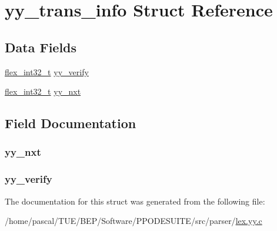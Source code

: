 \hypertarget{structyy__trans__info}{\section{yy\-\_\-trans\-\_\-info Struct Reference}
\label{structyy__trans__info}
}
\subsection*{Data Fields}
\begin{DoxyCompactItemize}
\item 
\hyperlink{lex_8yy_8c_a838ce943cf44ef7769480714fc6c3ba9}{flex\-\_\-int32\-\_\-t} \hyperlink{structyy__trans__info_a5faf5583708f5fa457bc1cb9bab86e38}{yy\-\_\-verify}
\item 
\hyperlink{lex_8yy_8c_a838ce943cf44ef7769480714fc6c3ba9}{flex\-\_\-int32\-\_\-t} \hyperlink{structyy__trans__info_a51bfd9e47041873b7b8075c677d1cfe1}{yy\-\_\-nxt}
\end{DoxyCompactItemize}


\subsection{Field Documentation}
\hypertarget{structyy__trans__info_a51bfd9e47041873b7b8075c677d1cfe1}{
\subsubsection[{yy\-\_\-nxt}]{ yy\-\_\-nxt}}\label{structyy__trans__info_a51bfd9e47041873b7b8075c677d1cfe1}
\hypertarget{structyy__trans__info_a5faf5583708f5fa457bc1cb9bab86e38}{
\subsubsection[{yy\-\_\-verify}]{ yy\-\_\-verify}}\label{structyy__trans__info_a5faf5583708f5fa457bc1cb9bab86e38}


The documentation for this struct was generated from the following file\-:\begin{DoxyCompactItemize}
\item 
/home/pascal/\-T\-U\-E/\-B\-E\-P/\-Software/\-P\-P\-O\-D\-E\-S\-U\-I\-T\-E/src/parser/\hyperlink{lex_8yy_8c}{lex.\-yy.\-c}\end{DoxyCompactItemize}
